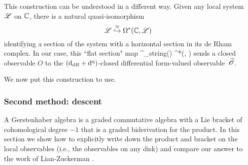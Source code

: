 
This construction can be understood in a different way. 
Given any local system $\mathscr L$ on $\mathbb C$, 
there is a natural quasi-isomorphism
\[
\mathscr L \overset{\simeq}{\hookrightarrow} \Omega^*(\mathbb C, \mathscr L)
\]
identifying a section of the system with a horizontal section in  its de Rham complex.
In our case, this ``flat section" map 
\ben
\Obs^\q_{\rm string}(\CC) \to \Omega^*(\CC , )
\een
sends a closed observable $O$ to the $({\rm d}_{dR} + {\rm d}^{\rm q})$-closed differential form-valued observable~$\widetilde{\mathscr O}$. 

We now put this construction to use.


\subsubsection{Second method: descent}

A Gerstenhaber algebra is a graded commutative algebra with a Lie bracket of cohomological degree $-1$ that is a graded biderivation for the product. 
In this section we show how to explicitly write down the product and bracket on the local observables (i.e., the observables on any disk) and compare our answer to the work of Lian-Zuckerman \cite{LZ1}.

